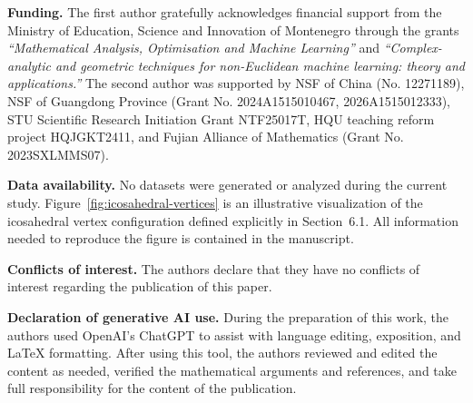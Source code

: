 \documentclass[10pt]{amsart}
\numberwithin{equation}{section}
\theoremstyle{definition}
\begin{document}
\medskip

\noindent\textbf{Funding.} The first author gratefully acknowledges financial support from the Ministry of Education, Science and Innovation of Montenegro through the grants \emph{``Mathematical Analysis, Optimisation and Machine Learning''} and \emph{``Complex-analytic and geometric techniques for non-Euclidean machine learning: theory and applications.''} The second author was supported by NSF of China (No. 12271189), NSF of Guangdong Province (Grant No. 2024A1515010467, 2026A1515012333), STU Scientific Research Initiation Grant NTF25017T, HQU teaching reform project HQJGKT2411, and Fujian Alliance of Mathematics (Grant No. 2023SXLMMS07).

\medskip

\noindent\textbf{Data availability.} No datasets were generated or analyzed during the current study. Figure~\ref{fig:icosahedral-vertices} is an illustrative visualization of the icosahedral vertex configuration defined explicitly in Section~6.1. All information needed to reproduce the figure is contained in the manuscript.

\medskip

\noindent\textbf{Conflicts of interest.} The authors declare that they have no conflicts of interest regarding the publication of this paper.

\medskip

\noindent\textbf{Declaration of generative AI use.}
During the preparation of this work, the authors used OpenAI's ChatGPT to assist with language editing, exposition, and LaTeX formatting. After using this tool, the authors reviewed and edited the content as needed, verified the mathematical arguments and references, and take full responsibility for the content of the publication.
\end{document}
